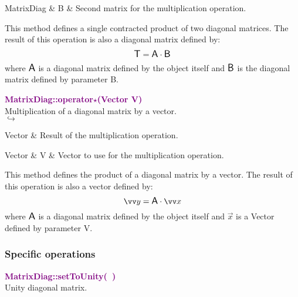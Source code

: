 \begin{tcolorbox}[width=\textwidth,myArgs,tabularx={ll|R}]
MatrixDiag & B & Second matrix for the multiplication operation.
\end{tcolorbox}

This method defines a single contracted product of two diagonal matrices.
The result of this operation is also a diagonal matrix defined by:
\begin{equation*}
\mbox{\large\ensuremath{\mathsf{T}}} = \mbox{\large\ensuremath{\mathsf{A}}} \cdot \mbox{\large\ensuremath{\mathsf{B}}}
\end{equation*}
where $\mbox{\large\ensuremath{\mathsf{A}}}$ is a diagonal matrix defined by the object itself and $\mbox{\large\ensuremath{\mathsf{B}}}$ is the diagonal matrix defined by parameter B.

\textcolor{purple}{\textbf{MatrixDiag::operator$\star$(Vector V)}}\label{MatrixDiag::operator*(Vector V)}\\
Multiplication of a diagonal matrix by a vector.\\ \hspace*{5mm}$\hookrightarrow$
\vspace*{-2em}\begin{tcolorbox}[grow to left by=-1cm, width=\textwidth-1cm,myArgs,tabularx={l|R}]
Vector & Result of the multiplication operation.
\end{tcolorbox}

\begin{tcolorbox}[width=\textwidth,myArgs,tabularx={ll|R}]
Vector & V & Vector to use for the multiplication operation.
\end{tcolorbox}

This method defines the product of a diagonal matrix by a vector.
The result of this operation is also a vector defined by:
\begin{equation*}
\overrightarrow{y} = \A \cdot \overrightarrow{x}
\end{equation*}
where $\mbox{\large\ensuremath{\mathsf{A}}}$ is a diagonal matrix defined by the object itself and $\overrightarrow{x}$ is a Vector defined by parameter V.

\subsubsection{Specific operations}

\textcolor{purple}{\textbf{MatrixDiag::setToUnity(~)}}\label{MatrixDiag::setToUnity()}\\
Unity diagonal matrix.

